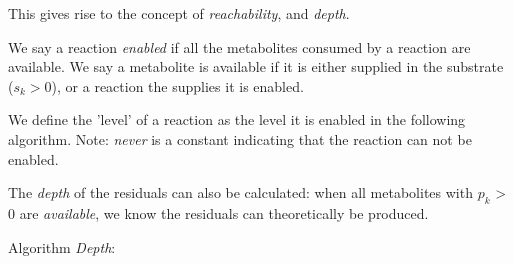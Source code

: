 \documentclass[12pt,twoside,fleqn,a4paper]{article}
\begin{document}
This gives rise to the concept of \emph{reachability}, and
\emph{depth}.

We say a reaction \emph{enabled} if all the metabolites consumed by a reaction
are available. We say a metabolite is available if it is either
supplied in the substrate ($s_k > 0$), or a reaction the supplies it
is enabled.

We define the 'level' of a reaction as the level it is enabled in the
following algorithm. Note: \emph{never} is a constant indicating that
the reaction can not be enabled.

The \emph{depth} of the residuals can also be calculated: when all
metabolites with $p_k$ > 0 are \emph{available}, we know the residuals
can theoretically be produced.


Algorithm \emph{Depth}:
\end{document}
